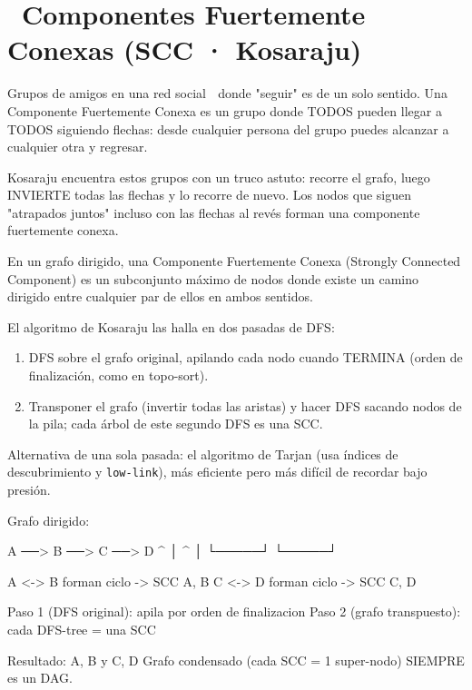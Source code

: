 \chapter[\emj{🧩}~Componentes Fuertemente Conexas (SCC · Kosaraju)]{~Componentes Fuertemente Conexas (SCC · Kosaraju)}

\begin{dsaquees}

Grupos de amigos en una red social 👥 donde "seguir" es de un solo
sentido. Una Componente Fuertemente Conexa es un grupo donde TODOS
pueden llegar a TODOS siguiendo flechas: desde cualquier persona del
grupo puedes alcanzar a cualquier otra y regresar.

Kosaraju encuentra estos grupos con un truco astuto: recorre el grafo,
luego INVIERTE todas las flechas y lo recorre de nuevo. Los nodos que
siguen "atrapados juntos" incluso con las flechas al revés forman una
componente fuertemente conexa.

\end{dsaquees}

\begin{dsaotraforma}

En un grafo dirigido, una Componente Fuertemente Conexa (Strongly
Connected Component) es un subconjunto máximo de nodos donde existe un
camino dirigido entre cualquier par de ellos en ambos sentidos.

El algoritmo de Kosaraju las halla en dos pasadas de DFS:
\begin{enumerate}
\item DFS sobre el grafo original, apilando cada nodo cuando TERMINA
      (orden de finalización, como en topo-sort).
\item Transponer el grafo (invertir todas las aristas) y hacer DFS
      sacando nodos de la pila; cada árbol de este segundo DFS es una SCC.
\end{enumerate}

Alternativa de una sola pasada: el algoritmo de Tarjan (usa índices de
descubrimiento y \verb|low-link|), más eficiente pero más difícil de
recordar bajo presión.

\end{dsaotraforma}

\begin{dsadiagrama}
Grafo dirigido:

  A ──> B ──> C ──> D
  ^     │     ^     │
  └─────┘     └─────┘

  A <-> B forman ciclo   -> SCC {A, B}
  C <-> D forman ciclo   -> SCC {C, D}

Paso 1 (DFS original): apila por orden de finalizacion
Paso 2 (grafo transpuesto): cada DFS-tree = una SCC

Resultado: {A, B}  y  {C, D}
Grafo condensado (cada SCC = 1 super-nodo) SIEMPRE es un DAG.
\end{dsadiagrama}

